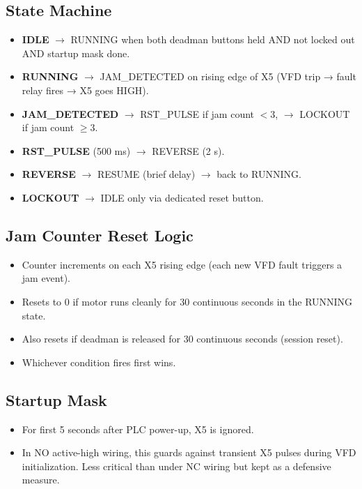 \documentclass[hidelinks,12pt]{article}
\begin{document}
\subsection{State Machine}
\begin{itemize}
    \item \textbf{IDLE} $\rightarrow$ RUNNING when both deadman buttons held AND not locked out AND startup mask done.
    \item \textbf{RUNNING} $\rightarrow$ JAM\_DETECTED on rising edge of X5 (VFD trip → fault relay fires → X5 goes HIGH).
    \item \textbf{JAM\_DETECTED} $\rightarrow$ RST\_PULSE if jam count $< 3$, $\rightarrow$ LOCKOUT if jam count $\geq 3$.
    \item \textbf{RST\_PULSE} (500 ms) $\rightarrow$ REVERSE (2 s).
    \item \textbf{REVERSE} $\rightarrow$ RESUME (brief delay) $\rightarrow$ back to RUNNING.
    \item \textbf{LOCKOUT} $\rightarrow$ IDLE only via dedicated reset button.
\end{itemize}

\subsection{Jam Counter Reset Logic}
\begin{itemize}
    \item Counter increments on each X5 rising edge (each new VFD fault triggers a jam event).
    \item Resets to 0 if motor runs cleanly for 30 continuous seconds in the RUNNING state.
    \item Also resets if deadman is released for 30 continuous seconds (session reset).
    \item Whichever condition fires first wins.
\end{itemize}

\subsection{Startup Mask}
\begin{itemize}
    \item For first 5 seconds after PLC power-up, X5 is ignored.
    \item In NO active-high wiring, this guards against transient X5 pulses during VFD initialization. Less critical than under NC wiring but kept as a defensive measure.
\end{itemize}
\end{document}
